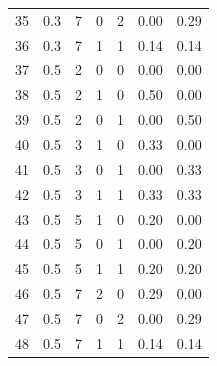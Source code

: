 \begin{longtable}{ccccccc}
35 & 0.3 & 7 & 0 & 2 & 0.00 & 0.29 \\
36 & 0.3 & 7 & 1 & 1 & 0.14 & 0.14 \\
37 & 0.5 & 2 & 0 & 0 & 0.00 & 0.00 \\
38 & 0.5 & 2 & 1 & 0 & 0.50 & 0.00 \\
39 & 0.5 & 2 & 0 & 1 & 0.00 & 0.50 \\
40 & 0.5 & 3 & 1 & 0 & 0.33 & 0.00 \\
41 & 0.5 & 3 & 0 & 1 & 0.00 & 0.33 \\
42 & 0.5 & 3 & 1 & 1 & 0.33 & 0.33 \\
43 & 0.5 & 5 & 1 & 0 & 0.20 & 0.00 \\
44 & 0.5 & 5 & 0 & 1 & 0.00 & 0.20 \\
45 & 0.5 & 5 & 1 & 1 & 0.20 & 0.20 \\
46 & 0.5 & 7 & 2 & 0 & 0.29 & 0.00 \\
47 & 0.5 & 7 & 0 & 2 & 0.00 & 0.29 \\
48 & 0.5 & 7 & 1 & 1 & 0.14 & 0.14 \\

\end{longtable}
